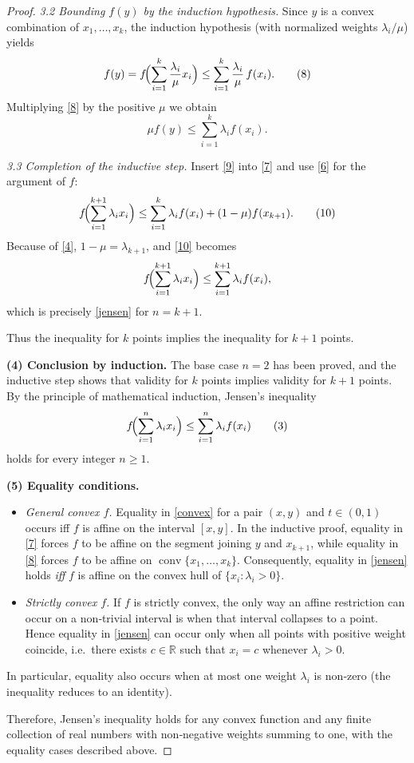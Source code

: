 \begin{proof}
\medskip

\textit{3.2 Bounding $f(y)$ by the induction hypothesis.}  
Since $y$ is a convex combination of $x_1,\dots,x_k$, the induction hypothesis (with normalized weights $\lambda_i/\mu$) yields
\[
f(y)=
f\!\Bigl(\sum_{i=1}^{k}\frac{\lambda_i}{\mu}x_i\Bigr)
\le
\sum_{i=1}^{k}\frac{\lambda_i}{\mu}\,f(x_i).
\tag{8}
\]
Multiplying \eqref{8} by the positive $\mu$ we obtain
\[
\mu f(y)\le\sum_{i=1}^{k}\lambda_i f(x_i).
\tag{9}
\]

\medskip

\textit{3.3 Completion of the inductive step.}  
Insert \eqref{9} into \eqref{7} and use \eqref{6} for the argument of $f$:
\[
f\!\Bigl(\sum_{i=1}^{k+1}\lambda_i x_i\Bigr)
\le
\sum_{i=1}^{k}\lambda_i f(x_i)+(1-\mu)f(x_{k+1}).
\tag{10}
\]
Because of \eqref{4}, $1-\mu=\lambda_{k+1}$, and \eqref{10} becomes
\[
f\!\Bigl(\sum_{i=1}^{k+1}\lambda_i x_i\Bigr)
\le
\sum_{i=1}^{k+1}\lambda_i f(x_i),
\]
which is precisely \eqref{jensen} for $n=k+1$.

Thus the inequality for $k$ points implies the inequality for $k+1$ points.

\medskip

\textbf{(4) Conclusion by induction.}  
The base case $n=2$ has been proved, and the inductive step shows that validity for $k$ points implies validity for $k+1$ points.  By the principle of mathematical induction, Jensen’s inequality
\[
f\!\Bigl(\sum_{i=1}^{n}\lambda_i x_i\Bigr)\le\sum_{i=1}^{n}\lambda_i f(x_i)
\tag{3}
\]
holds for every integer $n\ge1$.

\medskip

\textbf{(5) Equality conditions.}
\begin{itemize}
\item \textit{General convex $f$.}  
Equality in \eqref{convex} for a pair $(x,y)$ and $t\in(0,1)$ occurs iff $f$ is affine on the interval $[x,y]$.  In the inductive proof, equality in \eqref{7} forces $f$ to be affine on the segment joining $y$ and $x_{k+1}$, while equality in \eqref{8} forces $f$ to be affine on $\operatorname{conv}\{x_1,\dots,x_k\}$.  Consequently, equality in \eqref{jensen} holds \emph{iff} $f$ is affine on the convex hull of $\{x_i:\lambda_i>0\}$.

\item \textit{Strictly convex $f$.}  
If $f$ is strictly convex, the only way an affine restriction can occur on a non‑trivial interval is when that interval collapses to a point.  Hence equality in \eqref{jensen} can occur only when all points with positive weight coincide, i.e.\ there exists $c\in\mathbb R$ such that $x_i=c$ whenever $\lambda_i>0$.
\end{itemize}
In particular, equality also occurs when at most one weight $\lambda_i$ is non‑zero (the inequality reduces to an identity).

\medskip

Therefore, Jensen’s inequality holds for any convex function and any finite collection of real numbers with non‑negative weights summing to one, with the equality cases described above.
\end{proof}